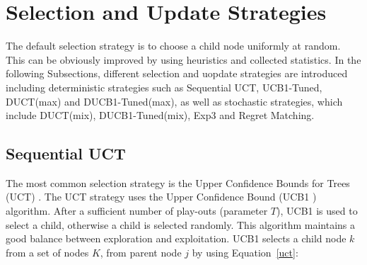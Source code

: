 \documentclass{article}
\begin{document}


\section{Selection and Update Strategies}
\label{sec:selection_strategies}

The default selection strategy is to choose a child node uniformly at random.
This can be obviously improved by using heuristics and collected statistics. In the following Subsections, different selection and uopdate strategies are introduced including deterministic strategies such as Sequential UCT, UCB1-Tuned, DUCT(max) and DUCB1-Tuned(max), as well as stochastic strategies, which include DUCT(mix), DUCB1-Tuned(mix), Exp3 and Regret Matching. 

\subsection{Sequential UCT}
\label{subsec:uct}
The most common selection strategy is the Upper Confidence Bounds for Trees (UCT) \cite{kocsis}. The UCT strategy uses the Upper Confidence Bound (UCB1 \cite{auer_et_al}) algorithm. 
After a sufficient number of play-outs (parameter $T$), UCB1 is used to select a child, otherwise a child is selected randomly. This algorithm maintains a good balance between exploration and exploitation. UCB1 selects a child node $k$ from a set of nodes $K$, from parent node $j$ by using Equation~\ref{uct}:
\end{document}

